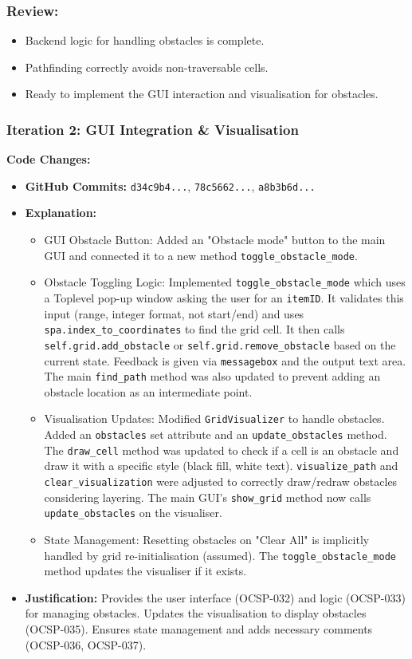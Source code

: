 \subsubsection{Review:}
\begin{itemize}
	\item Backend logic for handling obstacles is complete.
	\item Pathfinding correctly avoids non-traversable cells.
	\item Ready to implement the GUI interaction and visualisation for obstacles.
\end{itemize}

\newpage

\subsubsection{Iteration 2: GUI Integration \& Visualisation}

\textbf{Code Changes:}
\begin{itemize}
	\item \textbf{GitHub Commits:} \verb|d34c9b4...|, \verb|78c5662...|, \verb|a8b3b6d...|
	\item \textbf{Explanation:}
	\begin{itemize}
	    \item GUI Obstacle Button: Added an "Obstacle mode" button to the main GUI and connected it to a new method \verb|toggle_obstacle_mode|.
		\item Obstacle Toggling Logic: Implemented \verb|toggle_obstacle_mode| which uses a Toplevel pop-up window asking the user for an \verb|itemID|. It validates this input (range, integer format, not start/end) and uses \verb|spa.index_to_coordinates| to find the grid cell. It then calls \verb|self.grid.add_obstacle| or \verb|self.grid.remove_obstacle| based on the current state. Feedback is given via \verb|messagebox| and the output text area. The main \verb|find_path| method was also updated to prevent adding an obstacle location as an intermediate point.
		\item Visualisation Updates: Modified \verb|GridVisualizer| to handle obstacles. Added an \verb|obstacles| set attribute and an \verb|update_obstacles| method. The \verb|draw_cell| method was updated to check if a cell is an obstacle and draw it with a specific style (black fill, white text). \verb|visualize_path| and \verb|clear_visualization| were adjusted to correctly draw/redraw obstacles considering layering. The main GUI's \verb|show_grid| method now calls \verb|update_obstacles| on the visualiser.
		\item State Management: Resetting obstacles on "Clear All" is implicitly handled by grid re-initialisation (assumed). The \verb|toggle_obstacle_mode| method updates the visualiser if it exists.
	\end{itemize}
	\item \textbf{Justification:} Provides the user interface (OCSP-032) and logic (OCSP-033) for managing obstacles. Updates the visualisation to display obstacles (OCSP-035). Ensures state management and adds necessary comments (OCSP-036, OCSP-037).
\end{itemize}

